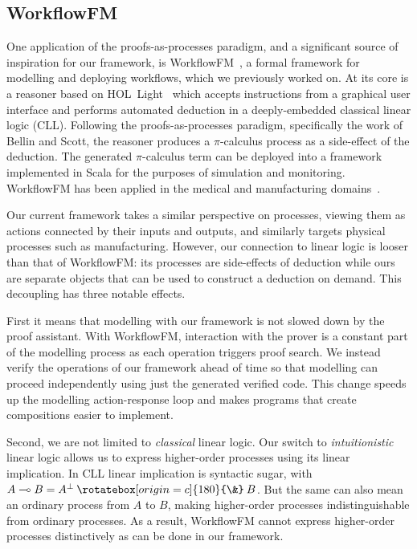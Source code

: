 \documentclass[class=smolathesis,crop=false]{standalone}
\begin{document}
\subsection{WorkflowFM}
\label{sec:intro/pap/wfm}

One application of the proofs-as-processes paradigm, and a significant source of inspiration for our framework, is WorkflowFM~\cite{papapa_fleuriot-2017}, a formal framework for modelling and deploying workflows, which we previously worked on.
At its core is a reasoner based on HOL~Light~\cite{harrison-2009} which accepts instructions from a graphical user interface and performs automated deduction in a deeply-embedded classical linear logic (CLL).
Following the proofs-as-processes paradigm, specifically the work of Bellin and Scott, the reasoner produces a $\pi$-calculus process as a side-effect of the deduction.
The generated $\pi$-calculus term can be deployed into a framework implemented in Scala for the purposes of simulation and monitoring.
WorkflowFM has been applied in the medical and manufacturing domains~\cite{manataki_et_al-2017,papapa_fleuriot-2015,papapa_et_al-2021}.

Our current framework takes a similar perspective on processes, viewing them as actions connected by their inputs and outputs, and similarly targets physical processes such as manufacturing.
However, our connection to linear logic is looser than that of WorkflowFM: its processes are side-effects of deduction while ours are separate objects that can be used to construct a deduction on demand.
This decoupling has three notable effects.

First it means that modelling with our framework is not slowed down by the proof assistant.
With WorkflowFM, interaction with the prover is a constant part of the modelling process as each operation triggers proof search.
We instead verify the operations of our framework ahead of time so that modelling can proceed independently using just the generated verified code.
This change speeds up the modelling action-response loop and makes programs that create compositions easier to implement.

Second, we are not limited to \emph{classical} linear logic.
Our switch to \emph{intuitionistic} linear logic allows us to express higher-order processes using its linear implication.
In CLL linear implication is syntactic sugar, with $A \multimap B = A^\bot \mathbin{\rotatebox[origin=c]{180}{\&}} B$.
But the same can also mean an ordinary process from $A$ to $B$, making higher-order processes indistinguishable from ordinary processes.
As a result, WorkflowFM cannot express higher-order processes distinctively as can be done in our framework.
\end{document}
